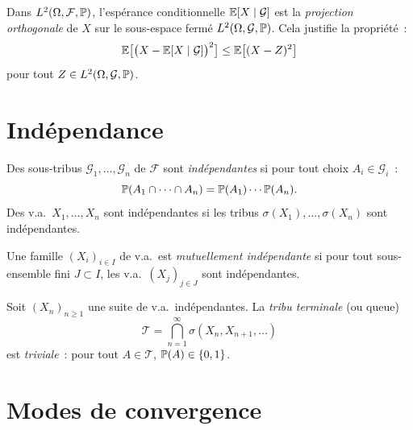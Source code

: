 \begin{intuition}[title=\textbf{Interpr\'etation g\'eom\'etrique}]
Dans $L^2(\Omega, \mathcal{F}, \mathbb{P})$, l'esp\'erance conditionnelle $\mathbb{E}[X \mid \mathcal{G}]$
est la \emph{projection orthogonale} de $X$ sur le sous-espace ferm\'e
$L^2(\Omega, \mathcal{G}, \mathbb{P})$. Cela justifie la propri\'et\'e~:
\[
  \mathbb{E}\bigl[\bigl(X - \mathbb{E}[X \mid \mathcal{G}]\bigr)^2\bigr]
  \leq \mathbb{E}\bigl[(X - Z)^2\bigr]
\]
pour tout $Z \in L^2(\Omega, \mathcal{G}, \mathbb{P})$.
\end{intuition}

\section{Ind\'ependance}

\begin{definition}
Des sous-tribus $\mathcal{G}_1, \ldots, \mathcal{G}_n$ de $\mathcal{F}$ sont
\emph{ind\'ependantes} si pour tout choix $A_i \in \mathcal{G}_i$~:
\[
  \mathbb{P}(A_1 \cap \cdots \cap A_n) = \mathbb{P}(A_1) \cdots \mathbb{P}(A_n).
\]
Des v.a.\ $X_1, \ldots, X_n$ sont ind\'ependantes si les tribus $\sigma(X_1), \ldots,
\sigma(X_n)$ sont ind\'ependantes.
\end{definition}

\begin{definition}
Une famille $(X_i)_{i \in I}$ de v.a.\ est \emph{mutuellement ind\'ependante}
si pour tout sous-ensemble fini $J \subset I$, les v.a.\ $(X_j)_{j \in J}$
sont ind\'ependantes.
\end{definition}

\begin{theoreme}
\label{thm:kolmo01}
Soit $(X_n)_{n \geq 1}$ une suite de v.a.\ ind\'ependantes. La \emph{tribu
terminale} (ou queue)
\[
  \mathcal{T} = \bigcap_{n=1}^{\infty} \sigma(X_n, X_{n+1}, \ldots)
\]
est \emph{triviale}~: pour tout $A \in \mathcal{T}$, $\mathbb{P}(A) \in \{0, 1\}$.
\end{theoreme}

\section{Modes de convergence}

